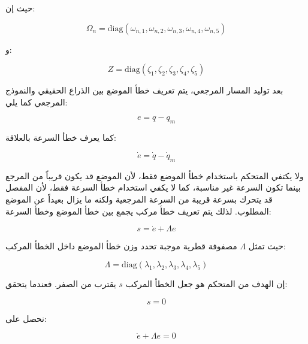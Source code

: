 حيث إن:

\begin{equation}
\Omega_n=
\mathrm{diag}
\left(
\omega_{n,1},
\omega_{n,2},
\omega_{n,3},
\omega_{n,4},
\omega_{n,5}
\right)
\label{eq:actc_omega_matrix}
\end{equation}

و:

\begin{equation}
Z=
\mathrm{diag}
\left(
\zeta_1,
\zeta_2,
\zeta_3,
\zeta_4,
\zeta_5
\right)
\label{eq:actc_zeta_matrix}
\end{equation}

بعد توليد المسار المرجعي، يتم تعريف خطأ الموضع بين الذراع الحقيقي والنموذج المرجعي كما يلي:

\begin{equation}
e=q-q_m
\label{eq:actc_position_error}
\end{equation}

كما يعرف خطأ السرعة بالعلاقة:

\begin{equation}
\dot{e}=\dot{q}-\dot{q}_m
\label{eq:actc_velocity_error}
\end{equation}

ولا يكتفي المتحكم باستخدام خطأ الموضع فقط، لأن الموضع قد يكون قريباً من المرجع بينما تكون السرعة غير مناسبة، كما لا يكفي استخدام خطأ السرعة فقط، لأن المفصل قد يتحرك بسرعة قريبة من السرعة المرجعية ولكنه ما يزال بعيداً عن الموضع المطلوب. لذلك يتم تعريف خطأ مركب يجمع بين خطأ الموضع وخطأ السرعة:

\begin{equation}
s=\dot{e}+\Lambda e
\label{eq:actc_composite_error}
\end{equation}

حيث تمثل \(\Lambda\) مصفوفة قطرية موجبة تحدد وزن خطأ الموضع داخل الخطأ المركب:

\begin{equation}
\Lambda=
\mathrm{diag}
\left(
\lambda_1,
\lambda_2,
\lambda_3,
\lambda_4,
\lambda_5
\right)
\label{eq:actc_lambda_matrix}
\end{equation}

إن الهدف من المتحكم هو جعل الخطأ المركب \(s\) يقترب من الصفر. فعندما يتحقق:

\begin{equation}
s=0
\label{eq:actc_composite_error_zero}
\end{equation}

نحصل على:

\begin{equation}
\dot{e}+\Lambda e=0
\label{eq:actc_error_dynamics}
\end{equation}

